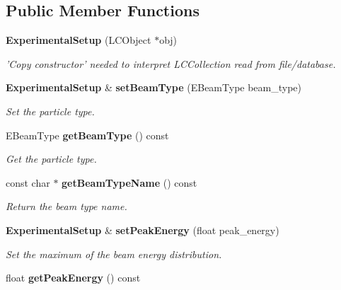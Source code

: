 \subsection*{Public Member Functions}
\begin{DoxyCompactItemize}
\item 
{\bf Experimental\-Setup} (L\-C\-Object $\ast$obj)\label{classCALICE_1_1ExperimentalSetup_a88f1b7e3e0bcfa5ef4a7941aa73e9695}

\begin{DoxyCompactList}\small\item\em 'Copy constructor' needed to interpret L\-C\-Collection read from file/database. \end{DoxyCompactList}\item 
{\bf Experimental\-Setup} \& {\bf set\-Beam\-Type} (E\-Beam\-Type beam\-\_\-type)\label{classCALICE_1_1ExperimentalSetup_a20e8811ecac60c745309792aeaf309c3}

\begin{DoxyCompactList}\small\item\em Set the particle type. \end{DoxyCompactList}\item 
E\-Beam\-Type {\bf get\-Beam\-Type} () const \label{classCALICE_1_1ExperimentalSetup_aed66233c7e7f7aaab32bf2fc52be38a6}

\begin{DoxyCompactList}\small\item\em Get the particle type. \end{DoxyCompactList}\item 
const char $\ast$ {\bf get\-Beam\-Type\-Name} () const \label{classCALICE_1_1ExperimentalSetup_ac337adc9b904f67631ca5686fe348c77}

\begin{DoxyCompactList}\small\item\em Return the beam type name. \end{DoxyCompactList}\item 
{\bf Experimental\-Setup} \& {\bf set\-Peak\-Energy} (float peak\-\_\-energy)\label{classCALICE_1_1ExperimentalSetup_a6bdbbf294d4f9a219c11000887845a42}

\begin{DoxyCompactList}\small\item\em Set the maximum of the beam energy distribution. \end{DoxyCompactList}\item 
float {\bf get\-Peak\-Energy} () const \label{classCALICE_1_1ExperimentalSetup_adc0d1f521ba8c3cca79caa412f05f807}


\end{DoxyCompactItemize}
